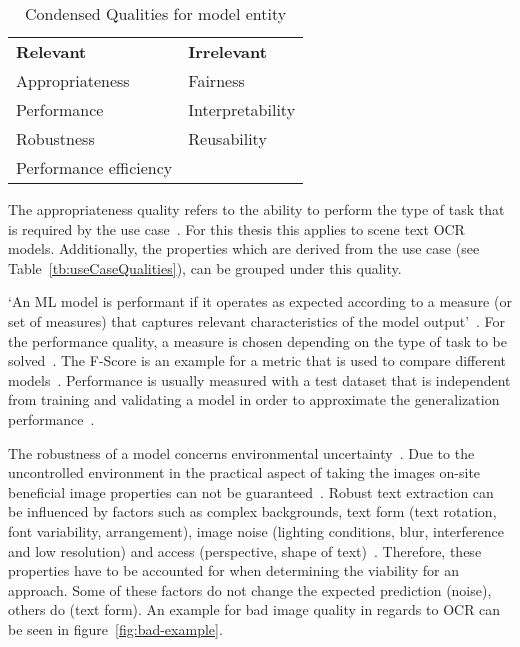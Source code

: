 \begin{table}[h]
    \centering\scriptsize
    \begin{tabular}{l l}
        \textbf{Relevant}                & \textbf{Irrelevant} \\
        Appropriateness         & Fairness  \\
        Performance             & Interpretability \\
        Robustness              & Reusability \\
        Performance efficiency  & \\
    \end{tabular}
    \caption{Condensed Qualities for model entity\label{tb:condensedQualities}}
\end{table}

The appropriateness quality refers to the ability to perform the type of task that is required by
the use case~\citep{siebert_construction_2021,nakamichi_requirements-driven_2020}.
For this thesis this applies to scene text \ac{OCR} models.
Additionally, the properties which are derived from the use case (see Table~\ref{tb:useCaseQualities}),
can be grouped under this quality.

`An ML model is performant if it operates as expected according to a measure (or set of measures)
that captures relevant characteristics of the model output'~\citep{ashmore_assuring_2021}.
For the performance quality, a measure is chosen depending on the type of task to be
solved~\citep{siebert_construction_2021}.
The F-Score is an example for a metric that is used to compare different
models~\cite{chen_text_2021, long_scene_2021}.
Performance is usually measured with a test dataset that is independent from training and validating
a model in order to approximate the generalization performance~\cite{goodfellow_deep_2016,
nakamichi_requirements-driven_2020}.

The robustness of a model concerns environmental uncertainty~\cite{ashmore_assuring_2021}.
Due to the uncontrolled environment in the practical aspect of taking the images on-site
beneficial image properties can not be guaranteed~\citep{chen_text_2021}.
Robust text extraction can be influenced by factors such as complex backgrounds, text form
(text rotation, font variability, arrangement), image noise (lighting conditions, blur,
interference and low resolution) and access (perspective, shape of
text)~\citep{oyedotun_deep_2015,ghosh_visual_2017,chen_text_2021}.
Therefore, these properties have to be accounted for when determining the viability for an approach.
Some of these factors do not change the expected prediction (noise), others do (text
form)\cite{hu_towards_2020}.
An example for bad image quality in regards to \ac{OCR} can be seen in figure~\ref{fig:bad-example}.


